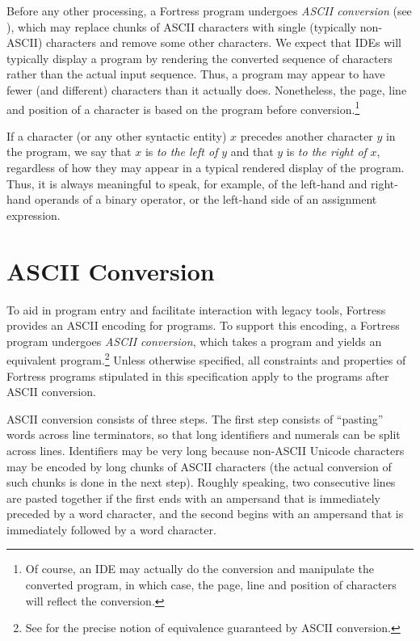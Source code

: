 Before any other processing,
a Fortress program undergoes \emph{ASCII conversion}
(see ),
which may replace chunks of ASCII characters
with single (typically non-ASCII) characters
and remove some other characters.
We expect that IDEs will typically display a program
by rendering the converted sequence of characters
rather than the actual input sequence.
Thus, a program may appear to have fewer (and different) characters
than it actually does.
Nonetheless,
the page, line and position of a character
is based on the program before conversion.\footnote{Of course,
an IDE may actually do the conversion
and manipulate the converted program,
in which case,
the page, line and position of characters will reflect the conversion.
}

If a character (or any other syntactic entity) $x$
precedes another character $y$ in the program,
we say that $x$ is \emph{to the left of} $y$
and that $y$ is \emph{to the right of} $x$,
regardless of how they may appear
in a typical rendered display of the program.
Thus, it is always meaningful to speak,
for example,
of the left-hand and right-hand operands of a binary operator,
or the left-hand side of an assignment expression.


\section{ASCII Conversion}

To aid in program entry and facilitate interaction with legacy tools,
Fortress provides an ASCII encoding for programs.
To support this encoding,
a Fortress program undergoes \emph{ASCII conversion},
which takes a program
and yields an equivalent program.\footnote{See
 for the precise notion of equivalence
guaranteed by ASCII conversion.}
Unless otherwise specified,
all constraints and properties of Fortress programs
stipulated in this specification
apply to the programs after ASCII conversion.


ASCII conversion consists of three steps.
The first step consists of ``pasting'' words across line terminators,
so that long identifiers and numerals can be split across lines.
Identifiers may be very long
because non-ASCII Unicode characters may be encoded
by long chunks of ASCII characters
(the actual conversion of such chunks is done in the next step).
Roughly speaking,
two consecutive lines are pasted together
if the first ends with an ampersand
that is immediately preceded by a word character,
and the second begins with an ampersand
that is immediately followed by a word character.

